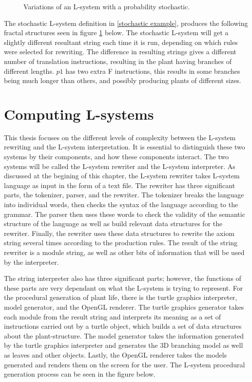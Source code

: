 \begin{figure}[htbp]
	{\centering
		\vspace{7px}
		\setlength{\fboxrule}{1pt}
		\caption{Variations of an L-system with a probability stochastic.} \label{stochastic diagram}
	}
\end{figure}
\FloatBarrier

\newpage
\noindent
The stochastic L-system definition in \ref{stochastic example}, produces the following fractal structures seen in figure \ref{stochastic diagram} below. The stochastic L-system will get a slightly different resultant string each time it is run, depending on which rules were selected for rewriting. The difference in resulting strings gives a different number of translation instructions, resulting in the plant having branches of different lengths. $p1$ has two extra F instructions, this results in some branches being much longer than others, and possibly producing plants of different sizes. 

\section{Computing L-systems}

This thesis focuses on the different levels of complexity between the L-system rewriting and the L-system interpretation. It is essential to distinguish these two systems by their components, and how these components interact. The two systems will be called the L-system rewriter and the L-system interpreter. As discussed at the begining of this chapter, the L-system rewriter takes L-system language as input in the form of a text file. The rewriter has three significant parts, the tokenizer, parser, and the rewriter. The tokenizer breaks the language into individual words, then checks the syntax of the language according to the grammar. The parser then uses these words to check the validity of the semantic structure of the language as well as build relevant data structures for the rewriter. Finally, the rewriter uses these data structures to rewrite the axiom string several times according to the production rules. The result of the string rewriter is a module string, as well as other bits of information that will be used by the interpreter. 

The string interpreter also has three significant parts; however, the functions of these parts are very dependant on what the L-system is trying to represent. For the procedural generation of plant life, there is the turtle graphics interpreter, model generator, and the OpenGL renderer. The turtle graphics generator takes each module from the result string and interprets its meaning as a set of instructions carried out by a turtle object, which builds a set of data structures about the plant-structure. The model generator takes the information generated by the turtle graphics interpreter and generates the 3D branching model as well as leaves and other objects. Lastly, the OpenGL renderer takes the models generated and renders them on the screen for the user. The L-system procedural generation process can be seen in the figure below.


